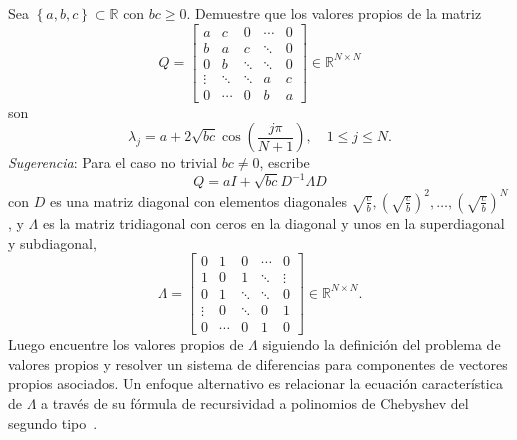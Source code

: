 \begin{questions}
	\question

	Sea $\left\{a,b,c\right\}\subset\mathbb{R}$ con $bc\geq 0$.
	Demuestre que los valores propios de la matriz
	\begin{equation*}
		Q=
		\begin{bmatrix}
			a      & c      & 0      & \cdots & 0 \\
			b      & a      & c      & \ddots & 0 \\
			0      & b      & \ddots & \ddots & 0 \\
			\vdots & \ddots & \ddots & a      & c \\
			0      & \cdots & 0      & b      & a
		\end{bmatrix}\in\mathbb{R}^{N\times N}
	\end{equation*}
	son
	\begin{equation*}
		\lambda_{j}=
		a+2\sqrt{bc}
		\cos\left(\frac{j\pi}{N+1}\right),
		\quad 1\leq j\leq N.
	\end{equation*}
	\textit{Sugerencia}:
	Para el caso no trivial $bc\neq 0$, escribe
	\begin{equation*}
		Q=
		aI+
		\sqrt{bc}D^{-1}\Lambda D
	\end{equation*}
	con $D$ es una matriz diagonal con elementos diagonales
	\begin{math}
		\sqrt{\frac{c}{b}},
		{\left(\sqrt{\frac{c}{b}}\right)}^{2},\dotsc,
		{\left(\sqrt{\frac{c}{b}}\right)}^{N}
	\end{math},
	y $\Lambda$ es la matriz tridiagonal con ceros en la diagonal y
	unos en la superdiagonal y subdiagonal,
	\begin{equation*}
		\Lambda=
		\begin{bmatrix}
			0      & 1      & 0      & \cdots & 0      \\
			1      & 0      & 1      & \ddots & \vdots \\
			0      & 1      & \ddots & \ddots & 0      \\
			\vdots & 0      & \ddots & 0      & 1      \\
			0      & \cdots & 0      & 1      & 0
		\end{bmatrix}\in\mathbb{R}^{N\times N}.
	\end{equation*}
	Luego encuentre los valores propios de $\Lambda$ siguiendo la definición
	del problema de valores propios y resolver un sistema de diferencias para
	componentes de vectores propios asociados.
	Un enfoque alternativo es relacionar la ecuación característica
	de $\Lambda$ a través de su fórmula de recursividad a polinomios de
	Chebyshev del segundo tipo~\cite[pág. 447]{Atkinson1991}.


\end{questions}
